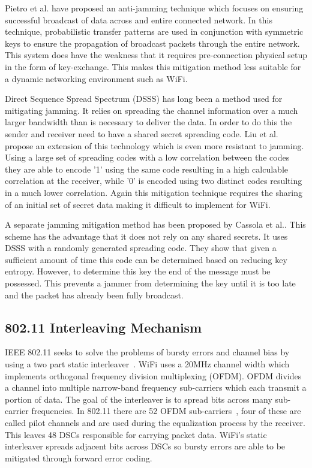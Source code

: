 \documentclass[sigconf, anonymous]{acmart}
\begin{document}
Pietro et al. have proposed an anti-jamming technique which focuses on ensuring successful broadcast of data across and entire connected network\cite{di2015freedom}. In this technique, probabilistic transfer patterns are used in conjunction with symmetric keys to ensure the propagation of broadcast packets through the entire network. This system does have the weakness that it requires pre-connection physical setup in the form of key-exchange. This makes this mitigation method less suitable for a dynamic networking environment such as WiFi.

Direct Sequence Spread Spectrum (DSSS) has long been a method used for mitigating jamming. It relies on spreading the channel information over a much larger bandwidth than is necessary to deliver the data. In order to do this the sender and receiver need to have a shared secret spreading code. Liu et al. propose an extension of this technology which is even more resistant to jamming\cite{liu2010randomized}. Using a large set of spreading codes with a low correlation between the codes they are able to encode '1' using the same code resulting in a high calculable correlation at the receiver, while '0' is encoded using two distinct codes resulting in a much lower correlation. Again this mitigation technique requires the sharing of an initial set of secret data making it difficult to implement for WiFi.

A separate jamming mitigation method has been proposed by Cassola et al.\cite{cassola2012efficient}. This scheme has the advantage that it does not rely on any shared secrets. It uses DSSS with a randomly generated spreading code. They show that given a sufficient amount of time this code can be determined based on reducing key entropy. However, to determine this key the end of the message must be possessed. This prevents a jammer from determining the key until it is too late and the packet has already been fully broadcast. 

\subsection{802.11 Interleaving Mechanism}
\label{sub:interleavingMech}

IEEE 802.11 seeks to solve the problems of bursty errors and channel bias by using a two part static interleaver~\cite{vo2016interleaving}. WiFi uses a 20MHz channel width which implements orthogonal frequency division multiplexing (OFDM). OFDM divides a channel into multiple narrow-band frequency sub-carriers which each transmit a portion of data. The goal of the interleaver is to spread bits across many sub-carrier frequencies. In 802.11 there are 52 OFDM sub-carriers~\cite{kapp2002802}, four of these are called pilot channels and are used during the equalization process by the receiver. This leaves 48 DSCs responsible for carrying packet data. WiFi's static interleaver spreads adjacent bits across DSCs so bursty errors are able to be mitigated through forward error coding.
\end{document}
